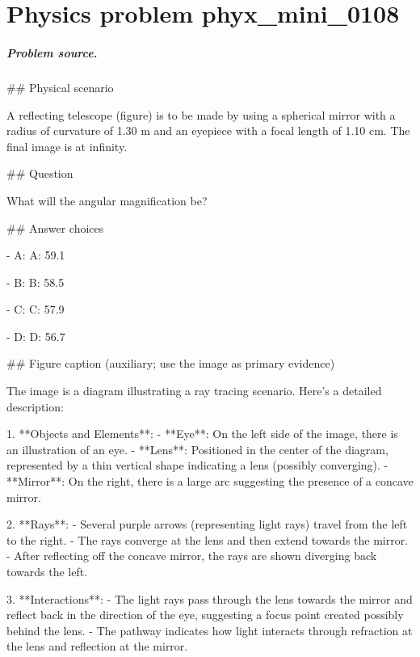 
\chapter{Physics problem phyx\_mini\_0108}
\label{ch:PhyXMiniProblems_problem_phyx_mini_0108}

\paragraph{Problem source.}
\#\# Physical scenario

A reflecting telescope (figure) is to be made by using a spherical mirror with a radius of curvature of 1.30 m and an eyepiece with a focal length of 1.10 cm. The final image is at infinity.

\#\# Question

What will the angular magnification be?

\#\# Answer choices

- A: A: 59.1

- B: B: 58.5

- C: C: 57.9

- D: D: 56.7

\#\# Figure caption (auxiliary; use the image as primary evidence)

The image is a diagram illustrating a ray tracing scenario. Here’s a detailed description:

1. **Objects and Elements**:
   - **Eye**: On the left side of the image, there is an illustration of an eye.
   - **Lens**: Positioned in the center of the diagram, represented by a thin vertical shape indicating a lens (possibly converging).
   - **Mirror**: On the right, there is a large arc suggesting the presence of a concave mirror.

2. **Rays**:
   - Several purple arrows (representing light rays) travel from the left to the right.
   - The rays converge at the lens and then extend towards the mirror.
   - After reflecting off the concave mirror, the rays are shown diverging back towards the left.

3. **Interactions**:
   - The light rays pass through the lens towards the mirror and reflect back in the direction of the eye, suggesting a focus point created possibly behind the lens.
   - The pathway indicates how light interacts through refraction at the lens and reflection at the mirror.

